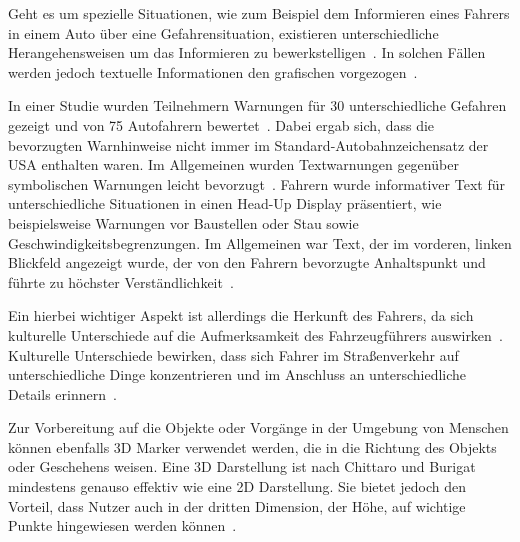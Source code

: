Geht es um spezielle Situationen, wie zum Beispiel dem Informieren eines Fahrers in einem Auto über eine Gefahrensituation, existieren unterschiedliche Herangehensweisen um das Informieren zu bewerkstelligen~\cite{keller1994visual}. In solchen Fällen werden jedoch textuelle Informationen den grafischen vorgezogen~\cite{green1995driver}.

In einer Studie wurden Teilnehmern Warnungen für 30 unterschiedliche Gefahren gezeigt und von 75 Autofahrern bewertet~\cite{green1995driver}. 
Dabei ergab sich, dass die bevorzugten Warnhinweise nicht immer im Standard-Autobahnzeichensatz der USA enthalten waren. 
Im Allgemeinen wurden Textwarnungen gegenüber symbolischen Warnungen leicht bevorzugt~\cite{green1995driver}.
Fahrern wurde informativer Text für unterschiedliche Situationen in einen Head-Up Display präsentiert, wie beispielsweise Warnungen vor Baustellen oder Stau sowie Geschwindigkeitsbegrenzungen. 
Im Allgemeinen war Text, der im vorderen, linken Blickfeld angezeigt wurde, der von den Fahrern bevorzugte Anhaltspunkt und führte zu höchster Verständlichkeit~\cite{green1995driver}.

Ein hierbei wichtiger Aspekt ist allerdings die Herkunft des Fahrers, da sich kulturelle Unterschiede auf die Aufmerksamkeit des Fahrzeugführers auswirken~\cite{shinohara2017visual}.
Kulturelle Unterschiede bewirken, dass sich Fahrer im Straßenverkehr auf unterschiedliche Dinge konzentrieren und im Anschluss an unterschiedliche Details erinnern~\cite{shinohara2017visual}.

Zur Vorbereitung auf die Objekte oder Vorgänge in der Umgebung von Menschen können ebenfalls 3D Marker verwendet werden, die in die Richtung des Objekts oder Geschehens weisen. Eine 3D Darstellung ist nach Chittaro und Burigat mindestens genauso effektiv wie eine 2D Darstellung. Sie bietet jedoch den Vorteil, dass Nutzer auch in der dritten Dimension, der Höhe, auf wichtige Punkte hingewiesen werden können~\cite{chittaro20043d}.
